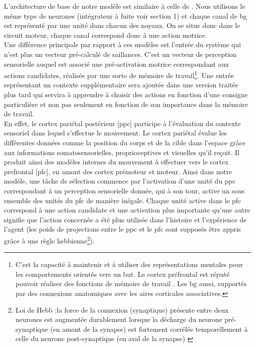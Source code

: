 L'architecture de base de notre modèle est similaire à celle de \cite{Gurney:2001a, Gurney:2001b, Girard:2005a, Girard:2008}. Nous utilisons le même type de neurones (intégrateur à fuite voir section 1) et chaque canal de \gls{bg} est représenté par une unité dans chacun des noyaux. On se situe donc dans le circuit moteur, chaque canal correspond donc à une action motrice.\\ 

Une différence principale par rapport à ces modèles est l'entrée du système qui n'est plus un vecteur pré-calculé de saillances. C'est un vecteur de perception sensorielle auquel est associé une pré-activation motrice correspondant aux actions candidates, réalisée par une sorte de mémoire de travail\footnote{C'est la capacit\'e \`a maintenir et \`a utiliser des repr\'esentations mentales pour les comportements orient\'es vers un but. Le cortex pr\'efrontal est réputé pouvoir réaliser des fonctions de m\'emoire de travail \cite{Petrides:1994, Cohen:1997}. Les \gls{bg} aussi, support\'es par des connexions anatomiques avec les aires corticales associatives.}. %
Une entrée représentant un contexte supplémentaire sera ajoutée dans une version traitée plus tard qui servira à apprendre à choisir des actions en fonction d'une consigne particulière et non pas seulement en fonction de son importance dans la mémoire de travail.\\

En effet, le cortex pariétal postérieur [\gls{ppc}] participe à l'évaluation du contexte sensoriel dans lequel s'effectue le mouvement. Le cortex pariétal évalue les différentes données comme la position du corps et de la cible dans l'espace grâce aux informations somatosensorielles, proprioceptives et visuelles qu’il reçoit. Il produit ainsi des modèles internes du mouvement à effectuer vers le cortex prefrontal [\gls{pfc}], en amont des cortex prémoteur et moteur. Ainsi dans notre modèle, une tâche de sélection commence par l'activation d'une unité du \gls{ppc} correspondant à un perception sensorielle donnée, qui à son tour, active un sous ensemble des unités du \gls{pfc} de manière inégale. Chaque unité active dans le \gls{pfc} correspond à une action candidate et une activation plus importante qu'une autre signifie que l'action concernée a été plus utilisée dans l'histoire et l'expérience de l'agent (les poids de projections entre le \gls{ppc} et le \gls{pfc} sont supposés être appris grâce à une règle hebbienne\footnote{Loi de Hebb :la force de la connexion (synaptique) présente entre deux neurones est augmentée durablement lorsque la décharge du neurone pré-synaptique (en amont de la synapse) est fortement corrélée temporellement à celle du neurone post-synaptique (en aval de la synapse) \cite{Hebb:1949}}).\\

